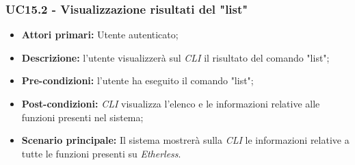 \subsubsection{UC15.2 - Visualizzazione risultati del "list"}
\begin{itemize}
	\item \textbf{Attori primari:} Utente autenticato;
	\item \textbf{Descrizione:} l'utente visualizzerà sul \textit{CLI\glo} il risultato del comando "list";
	\item \textbf{Pre-condizioni:} l'utente ha eseguito il comando "list";
	\item \textbf{Post-condizioni:} \textit{CLI\glo} visualizza l'elenco e le informazioni relative alle funzioni presenti nel sistema;
	\item \textbf{Scenario principale:} Il sistema mostrerà sulla \textit{CLI\glo} le informazioni relative a tutte le funzioni presenti su \textit{Etherless\glos}.
\end{itemize}
